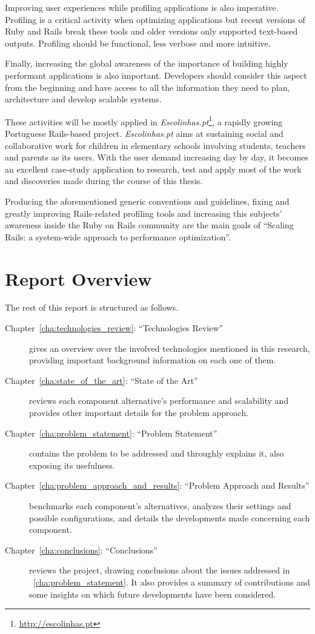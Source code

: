 Improving user experiences while profiling applications is also imperative. Profiling is a critical activity when optimizing applications but recent versions of Ruby and Rails break these tools and older versions only supported text-based outputs. Profiling should be functional, less verbose and more intuitive.

Finally, increasing the global awareness of the importance of building highly performant applications is also important. Developers should consider this aspect from the beginning and have access to all the information they need to plan, architecture and develop scalable systems.

These activities will be mostly applied in \textit{Escolinhas.pt}\footnote{\url{http://escolinhas.pt}}, a rapidly growing Portuguese Rails-based project. \textit{Escolinhas.pt} aims at sustaining social and collaborative work for children in elementary schools involving students, teachers and parents as its users. With the user demand increasing day by day, it becomes an excellent case-study application to research, test and apply most of the work and discoveries made during the course of this thesis.

Producing the aforementioned generic conventions and guidelines, fixing and greatly improving Rails-related profiling tools and increasing this subjects' awareness inside the Ruby on Rails community are the main goals of ``Scaling Rails: a system-wide approach to performance optimization''.


\section{Report Overview} %
\label{sec:report_overview}
The rest of this report is structured as follows.
\begin{description}
  \item[Chapter~\ref{cha:technologies_review}: ``Technologies Review''] gives an overview over the involved technologies mentioned in this research, providing important background information on each one of them.
  \item[Chapter~\ref{cha:state_of_the_art}: ``State of the Art''] reviews each component alternative's performance and scalability and provides other important details for the problem approach.
  \item[Chapter~\ref{cha:problem_statement}: ``Problem Statement''] contains the problem to be addressed and throughly explains it, also exposing its usefulness.
  \item[Chapter~\ref{cha:problem_approach_and_results}: ``Problem Approach and Results''] benchmarks each component's alternatives, analyzes their settings and possible configurations, and details the developments made concerning each component.
  \item[Chapter~\ref{cha:conclusions}: ``Conclusions''] reviews the project, drawing conclusions about the issues addressed in ~\ref{cha:problem_statement}. It also provides a summary of contributions and some insights on which future developments have been considered.
\end{description}

